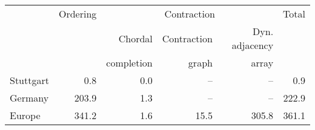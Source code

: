 \begin{tabular}{lrrrrr}
\toprule
{} &  Ordering & \multicolumn{3}{c}{Contraction} & Total \\ \cmidrule(lr){3-5}
{} &  {} &  Chordal &  Contraction & Dyn. adjacency & \\
{} &  {} &  completion & graph \cite{DBLP:journals/jea/DibbeltSW16} & array \cite{DBLP:journals/jea/DibbeltSW16} & \\
\midrule
Stuttgart &                          0.8 &                          0.0 &          -- &           -- &             0.9 \\
Germany   &                        203.9 &                          1.3 &          -- &           -- &           222.9 \\
Europe    &                        341.2 &                          1.6 &        15.5 &        305.8 &           361.1 \\
\bottomrule
\end{tabular}

